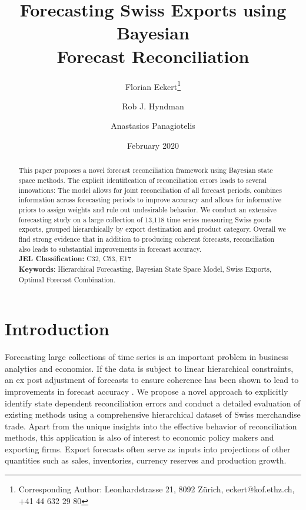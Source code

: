 \documentclass[a4paper,fleqn,11pt]{article}
\begin{document}
\title{\huge Forecasting Swiss Exports using Bayesian \\Forecast Reconciliation}

\author[$\dagger$]{Florian Eckert\thanks{Corresponding Author: Leonhardstrasse 21, 8092 Zürich, eckert@kof.ethz.ch, +41 44 632 29 80}}
\author[$\ddagger$]{Rob J. Hyndman}
\author[$\ddagger$]{Anastasios Panagiotelis}
\date{February 2020}

\clearpage\maketitle
\thispagestyle{empty}

\begin{abstract}
	\noindent This paper proposes a novel forecast reconciliation framework using Bayesian state space methods. The explicit identification of reconciliation errors leads to several innovations: The model allows for joint reconciliation of all forecast periods, combines information across forecasting periods to improve accuracy and allows for informative priors to assign weights and rule out undesirable behavior. We conduct an extensive forecasting study on a large collection of 13,118 time series measuring Swiss goods exports, grouped hierarchically by export destination and product category. Overall we find strong evidence that in addition to producing coherent forecasts, reconciliation also leads to substantial improvements in forecast accuracy.\\
	
	\noindent \textbf{JEL Classification:} C32, C53, E17\\
	\noindent \textbf{Keywords}: Hierarchical Forecasting, Bayesian State Space Model, Swiss Exports, Optimal Forecast Combination.
\end{abstract}
\clearpage
\setcounter{page}{1}

\section{Introduction}\label{sec:intro}

Forecasting large collections of time series is an important problem in business analytics and economics. If the data is subject to linear hierarchical constraints, an ex post adjustment of forecasts to ensure coherence has been shown to lead to improvements in forecast accuracy \citep[see][and references therein]{Wickramasuriya2015}. We propose a novel approach to explicitly identify state dependent reconciliation errors and conduct a detailed evaluation of existing methods using a comprehensive hierarchical dataset of Swiss merchandise trade. Apart from the unique insights into the effective behavior of reconciliation methods, this application is also of interest to economic policy makers and exporting firms. Export forecasts often serve as inputs into projections of other quantities such as sales, inventories, currency reserves and production growth. 
\end{document}
